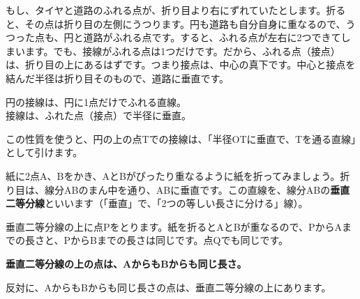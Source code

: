 \par\vspace{3pt}
もし、タイヤと道路のふれる点が、折り目より右にずれていたとします。折ると、その点は折り目の左側にうつります。円も道路も自分自身に重なるので、うつった点も、円と道路がふれる点です。すると、ふれる点が左右に2つできてしまいます。でも、接線がふれる点は1つだけです。だから、ふれる点（接点）は、折り目の上にあるはずです。つまり接点は、中心の真下です。中心と接点を結んだ半径は折り目そのもので、道路に垂直です。

\begin{taisetsu}
円の接線は、円に1点だけでふれる直線。\\
接線は、ふれた点（接点）で半径に垂直。
\end{taisetsu}

この性質を使うと、円の上の点Tでの接線は、「半径OTに垂直で、Tを通る直線」として引けます。


\leavevmode\label{bk:4-2:gaishin}紙に2点A、Bをかき、AとBがぴったり重なるように紙を折ってみましょう。折り目は、線分ABのまん中を通り、ABに垂直です。この直線を、線分ABの\textbf{垂直二等分線}といいます（「垂直」で、「2つの等しい長さに分ける」線）。

\noindent\begin{minipage}[c]{0.44\linewidth}\centering
{}
\end{minipage}\hfill
\begin{minipage}[c]{0.52\linewidth}
垂直二等分線の上に点Pをとります。紙を折るとAとBが重なるので、PからAまでの長さと、PからBまでの長さは同じです。点Qでも同じです。

\par\addvspace{3pt}
\textbf{垂直二等分線の上の点は、AからもBからも同じ長さ。}\par\noindent
反対に、AからもBからも同じ長さの点は、垂直二等分線の上にあります。
\end{minipage}


